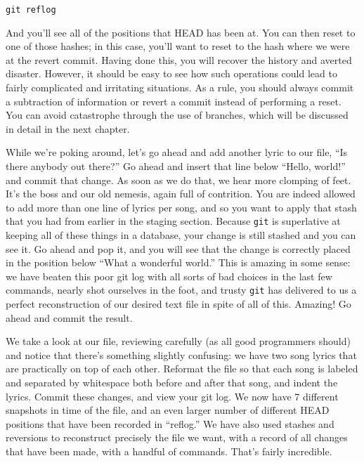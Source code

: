 {\begin{verbatim}
git reflog
\end{verbatim}

\par{
And you'll see all of the positions that HEAD has been at. You can then reset
to one of those hashes; in this case, you'll want to reset to the hash where
we were at the revert commit. Having done this, you will recover the history
and averted disaster. However, it should be easy to see how such operations
could lead to fairly complicated and irritating situations. As a rule, you
should always commit a subtraction of information or revert a commit instead
of performing a reset. You can avoid catastrophe through the use of branches,
which will be discussed in detail in the next chapter.
}

\par{
While we're poking around, let's go ahead and add another lyric to our file, 
``Is there anybody out there?''
Go ahead and insert that line below ``Hello, world!'' and commit that change.
As soon as we do that, we hear more clomping of feet. It's the boss and our
old nemesis, again full of contrition. You are indeed allowed to add more than
one line of lyrics per song, and so you want to apply that stash that you had
from earlier in the staging section. Because \verb+git+ is superlative at
keeping all of these things in a database, your change is still stashed and
you can see it. Go ahead and pop it, and you will see that the change is
correctly placed in the position below ``What a wonderful world.'' This is
amazing in some sense: we have beaten this poor git log with all sorts of bad
choices in the last few commands, nearly shot ourselves in the foot, and
trusty \verb+git+ has delivered to us a perfect reconstruction of our desired
text file in spite of all of this. Amazing! Go ahead and commit the result.
}

\par{
We take a look at our file, reviewing carefully (as all good programmers
should) and notice that there's something slightly confusing: we have two song
lyrics that are practically on top of each other. Reformat the file so that
each song is labeled and separated by whitespace both before and after that
song, and indent the lyrics. Commit these changes, and view your git log. We
now have 7 different snapshots in time of the file, and an even larger number
of different HEAD positions that have been recorded in ``reflog.'' We have
also used stashes and reversions to reconstruct precisely the file we want,
with a record of all changes that have been made, with a handful of commands.
That's fairly incredible.
}

}
